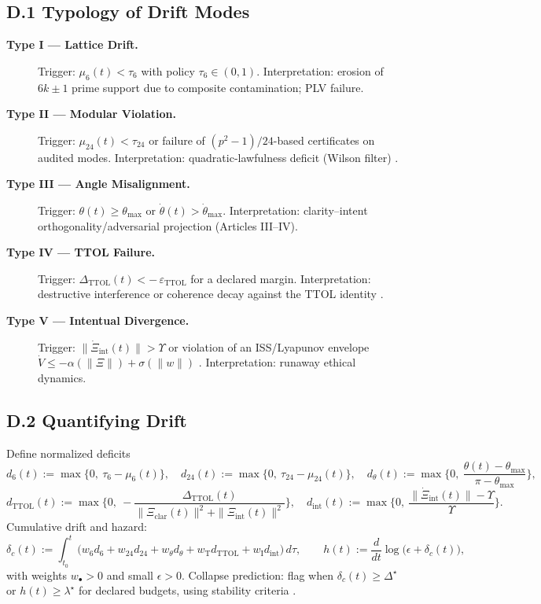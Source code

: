 \documentclass[12pt]{amsart}
\theoremstyle{plain}
\begin{document}
\subsection*{D.1 Typology of Drift Modes}
\begin{description}
  \item[\textbf{Type I — Lattice Drift.}] Trigger: $\mu_6(t)<\tau_6$ with policy $\tau_6\in(0,1)$. Interpretation: erosion of $6k\pm1$ prime support due to composite contamination; PLV failure.
  \item[\textbf{Type II — Modular Violation.}] Trigger: $\mu_{24}(t)<\tau_{24}$ or failure of $(p^2-1)/24$-based certificates on audited modes. Interpretation: quadratic-lawfulness deficit (Wilson filter) \cite{hardy2008introduction}.
  \item[\textbf{Type III — Angle Misalignment.}] Trigger: $\theta(t)\ge \theta_{\max}$ or $\dot\theta(t)>\dot\theta_{\max}$. Interpretation: clarity–intent orthogonality/adversarial projection (Articles III–IV).
  \item[\textbf{Type IV — TTOL Failure.}] Trigger: $\Delta_{\mathrm{TTOL}}(t)<-\,\varepsilon_{\mathrm{TTOL}}$ for a declared margin. Interpretation: destructive interference or coherence decay against the TTOL identity \cite{rudin1991functional,conway1990functional}.
  \item[\textbf{Type V — Intentual Divergence.}] Trigger: $\|\dot{\Xi}_{\mathrm{int}}(t)\|>\Upsilon$ or violation of an ISS/Lyapunov envelope $\dot V\le -\alpha(\|\Xi\|)+\sigma(\|w\|)$ \cite{khalil2002nonlinear}. Interpretation: runaway ethical dynamics.
\end{description}

\subsection*{D.2 Quantifying Drift}
Define normalized deficits
\[
d_6(t):=\max\{0,\ \tau_6-\mu_6(t)\},\quad
d_{24}(t):=\max\{0,\ \tau_{24}-\mu_{24}(t)\},\quad
d_{\theta}(t):=\max\Big\{0,\ \frac{\theta(t)-\theta_{\max}}{\pi-\theta_{\max}}\Big\},
\]
\[
d_{\mathrm{TTOL}}(t):=\max\Big\{0,\ -\frac{\Delta_{\mathrm{TTOL}}(t)}{\|\Xi_{\mathrm{clar}}(t)\|^{2}+\|\Xi_{\mathrm{int}}(t)\|^{2}}\Big\},\quad
d_{\mathrm{int}}(t):=\max\Big\{0,\ \frac{\|\dot{\Xi}_{\mathrm{int}}(t)\|-\Upsilon}{\Upsilon}\Big\}.
\]
Cumulative drift and hazard:
\[
\delta_c(t):=\int_{t_0}^{t}\!\big(w_6 d_6+w_{24} d_{24}+w_{\theta} d_{\theta}+w_{\mathrm{T}} d_{\mathrm{TTOL}}+w_{\mathrm{I}} d_{\mathrm{int}}\big)\,d\tau,\qquad
h(t):=\frac{d}{dt}\log\big(\epsilon+\delta_c(t)\big),
\]
with weights $w_{\bullet}>0$ and small $\epsilon>0$. Collapse prediction: flag when $\delta_c(t)\ge \Delta^{\star}$ or $h(t)\ge \lambda^{\star}$ for declared budgets, using stability criteria \cite{khalil2002nonlinear}.
\end{document}
